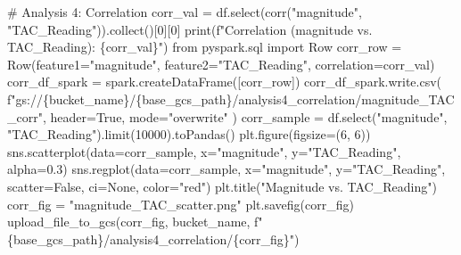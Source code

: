 \documentclass[
  letterpaper,
  DIV=11,
  numbers=noendperiod]{scrartcl}
\newenvironment{Shaded}{\begin{snugshade}}{\end{snugshade}}
\newcommand{\BuiltInTok}[1]{\textcolor[rgb]{0.98,0.46,0.51}{#1}}
\newcommand{\CommentTok}[1]{\textcolor[rgb]{0.42,0.45,0.49}{#1}}
\newcommand{\DecValTok}[1]{\textcolor[rgb]{0.47,0.72,1.00}{#1}}
\newcommand{\FloatTok}[1]{\textcolor[rgb]{0.47,0.72,1.00}{#1}}
\newcommand{\ImportTok}[1]{\textcolor[rgb]{0.62,0.80,1.00}{#1}}
\newcommand{\NormalTok}[1]{\textcolor[rgb]{0.88,0.89,0.91}{#1}}
\newcommand{\OperatorTok}[1]{\textcolor[rgb]{0.88,0.89,0.91}{#1}}
\newcommand{\SpecialCharTok}[1]{\textcolor[rgb]{0.47,0.72,1.00}{#1}}
\newcommand{\SpecialStringTok}[1]{\textcolor[rgb]{0.62,0.80,1.00}{#1}}
\newcommand{\StringTok}[1]{\textcolor[rgb]{0.62,0.80,1.00}{#1}}
\newcommand{\VariableTok}[1]{\textcolor[rgb]{1.00,0.67,0.44}{#1}}
\begin{document}
\begin{Shaded}
\begin{Highlighting}[]
    \CommentTok{\# Analysis 4: Correlation}
\NormalTok{    corr\_val }\OperatorTok{=}\NormalTok{ df.select(corr(}\StringTok{"magnitude"}\NormalTok{, }\StringTok{"TAC\_Reading"}\NormalTok{)).collect()[}\DecValTok{0}\NormalTok{][}\DecValTok{0}\NormalTok{]}
    \BuiltInTok{print}\NormalTok{(}\SpecialStringTok{f"Correlation (magnitude vs. TAC\_Reading): }\SpecialCharTok{\{}\NormalTok{corr\_val}\SpecialCharTok{\}}\SpecialStringTok{"}\NormalTok{)}
    \ImportTok{from}\NormalTok{ pyspark.sql }\ImportTok{import}\NormalTok{ Row}
\NormalTok{    corr\_row }\OperatorTok{=}\NormalTok{ Row(feature1}\OperatorTok{=}\StringTok{"magnitude"}\NormalTok{, feature2}\OperatorTok{=}\StringTok{"TAC\_Reading"}\NormalTok{, correlation}\OperatorTok{=}\NormalTok{corr\_val)}
\NormalTok{    corr\_df\_spark }\OperatorTok{=}\NormalTok{ spark.createDataFrame([corr\_row])}
\NormalTok{    corr\_df\_spark.write.csv(}
        \SpecialStringTok{f"gs://}\SpecialCharTok{\{}\NormalTok{bucket\_name}\SpecialCharTok{\}}\SpecialStringTok{/}\SpecialCharTok{\{}\NormalTok{base\_gcs\_path}\SpecialCharTok{\}}\SpecialStringTok{/analysis4\_correlation/magnitude\_TAC\_corr"}\NormalTok{,}
\NormalTok{        header}\OperatorTok{=}\VariableTok{True}\NormalTok{,}
\NormalTok{        mode}\OperatorTok{=}\StringTok{"overwrite"}
\NormalTok{    )}
\NormalTok{    corr\_sample }\OperatorTok{=}\NormalTok{ df.select(}\StringTok{"magnitude"}\NormalTok{, }\StringTok{"TAC\_Reading"}\NormalTok{).limit(}\DecValTok{10000}\NormalTok{).toPandas()}
\NormalTok{    plt.figure(figsize}\OperatorTok{=}\NormalTok{(}\DecValTok{6}\NormalTok{, }\DecValTok{6}\NormalTok{))}
\NormalTok{    sns.scatterplot(data}\OperatorTok{=}\NormalTok{corr\_sample, x}\OperatorTok{=}\StringTok{"magnitude"}\NormalTok{, y}\OperatorTok{=}\StringTok{"TAC\_Reading"}\NormalTok{, alpha}\OperatorTok{=}\FloatTok{0.3}\NormalTok{)}
\NormalTok{    sns.regplot(data}\OperatorTok{=}\NormalTok{corr\_sample, x}\OperatorTok{=}\StringTok{"magnitude"}\NormalTok{, y}\OperatorTok{=}\StringTok{"TAC\_Reading"}\NormalTok{, scatter}\OperatorTok{=}\VariableTok{False}\NormalTok{, ci}\OperatorTok{=}\VariableTok{None}\NormalTok{, color}\OperatorTok{=}\StringTok{"red"}\NormalTok{)}
\NormalTok{    plt.title(}\StringTok{"Magnitude vs. TAC\_Reading"}\NormalTok{)}
\NormalTok{    corr\_fig }\OperatorTok{=} \StringTok{"magnitude\_TAC\_scatter.png"}
\NormalTok{    plt.savefig(corr\_fig)}
\NormalTok{    upload\_file\_to\_gcs(corr\_fig, bucket\_name, }\SpecialStringTok{f"}\SpecialCharTok{\{}\NormalTok{base\_gcs\_path}\SpecialCharTok{\}}\SpecialStringTok{/analysis4\_correlation/}\SpecialCharTok{\{}\NormalTok{corr\_fig}\SpecialCharTok{\}}\SpecialStringTok{"}\NormalTok{)}


\end{Highlighting}
\end{Shaded}
\end{document}
